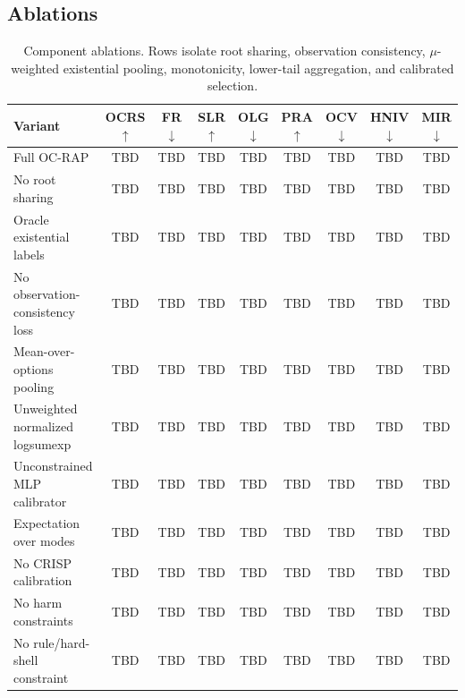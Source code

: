 \documentclass[conference]{IEEEtran}
\begin{document}
\subsection{Ablations}
\label{subsec:ablations}

\begin{table}[t]
\centering
\footnotesize
\caption{Component ablations.  Rows isolate root sharing, observation consistency, $\mu$-weighted existential pooling, monotonicity, lower-tail aggregation, and calibrated selection.}
\label{tab:component_ablation}
\begin{tabular}{lcccccccc}
\toprule
Variant & OCRS $\uparrow$ & FR $\downarrow$ & SLR $\uparrow$ & OLG $\downarrow$ & PRA $\uparrow$ & OCV $\downarrow$ & HNIV $\downarrow$ & MIR $\downarrow$ \\
\midrule
Full OC-RAP & TBD & TBD & TBD & TBD & TBD & TBD & TBD & TBD \\
No root sharing & TBD & TBD & TBD & TBD & TBD & TBD & TBD & TBD \\
Oracle existential labels & TBD & TBD & TBD & TBD & TBD & TBD & TBD & TBD \\
No observation-consistency loss & TBD & TBD & TBD & TBD & TBD & TBD & TBD & TBD \\
Mean-over-options pooling & TBD & TBD & TBD & TBD & TBD & TBD & TBD & TBD \\
Unweighted normalized logsumexp & TBD & TBD & TBD & TBD & TBD & TBD & TBD & TBD \\
Unconstrained MLP calibrator & TBD & TBD & TBD & TBD & TBD & TBD & TBD & TBD \\
Expectation over modes & TBD & TBD & TBD & TBD & TBD & TBD & TBD & TBD \\
No CRISP calibration & TBD & TBD & TBD & TBD & TBD & TBD & TBD & TBD \\
No harm constraints & TBD & TBD & TBD & TBD & TBD & TBD & TBD & TBD \\
No rule/hard-shell constraint & TBD & TBD & TBD & TBD & TBD & TBD & TBD & TBD \\
\bottomrule
\end{tabular}
\end{table}
\end{document}
